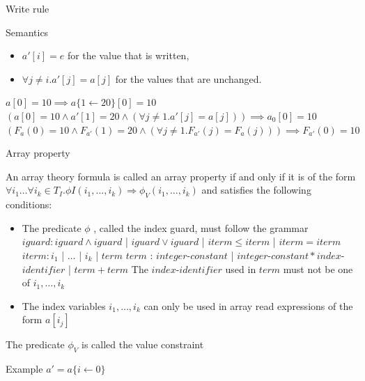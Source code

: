\documentclass{beamer}
\begin{document}
\begin{frame}{Write rule}
\begin{block}{Semantics}
\begin{itemize}
\item $a'[i] = e$ for the value that is written,
\item $\forall j \ne i. a'[j] = a[j]$ for the values that are unchanged.
\end{itemize}
\end{block}
$a[0] = 10 \implies a\{1 \leftarrow 20\}[0] = 10$\newline
$(a[0] = 10 \wedge a'[1] = 20 \wedge (\forall j \ne 1. a'[j] = a[j])) \implies a_0[0] = 10$\newline
$(F_a(0) = 10 \wedge F_{a'}(1) = 20 \wedge (\forall j \ne 1. F_{a'}(j) = F_a(j))) \implies F_{a'}(0) = 10$\newline
\end{frame}

\begin{frame}{Array property}
\begin{block}{}
An array theory formula is called an array property if and only if it is of the form\newline
$\forall i_1\dots \forall i_k \in T_I.\phi I (i_1, \dots, i_k) \Rightarrow \phi_V(i_1, \dots, i_k)$\newline
and satisfies the following conditions:
\begin{itemize}
\item The predicate $\phi$ , called the index guard, must follow the grammar\newline
$iguard : iguard \wedge iguard$ | $iguard \vee iguard$ | $iterm \le iterm$ | $iterm = iterm$\newline
$iterm : i_1$ | $\dots$ | $i_k$ | $term$\newline
$term$ : $integer$-$constant$ | $integer$-$constant * index$-$identifier$ | $term + term$\newline
The $index$-$identifier$ used in $term$ must not be one of $i_1, \dots, i_k$
\item The index variables $i_1, \dots, i_k$ can only be used in array read expressions of the form $a[i_j]$
\end{itemize}
The predicate $\phi_V$ is called the value constraint
\end{block}
\end{frame}

\begin{frame}{Example}
$a' = a\{i\leftarrow 0\}$\newline
\end{frame}
\end{document}
